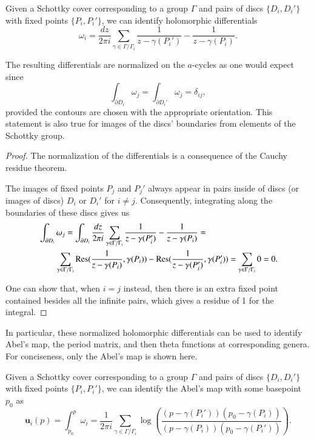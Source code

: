 \begin{definition}
    Given a Schottky cover corresponding to a group $\Gamma$ and pairs of discs $\{D_i,D_i'\}$ with fixed points $\{P_i,P_i'\}$, we can identify holomorphic differentials
    \begin{equation}
        \omega_i = \frac{dz}{2\pi i} \sum_{\gamma \in \Gamma / \Gamma_i} \frac{1}{z - \gamma(P_i')} - \frac{1}{z - \gamma(P_i)}.
    \end{equation}

    The resulting differentials are normalized on the $a$-cycles as one would expect since
    \begin{equation}
        \int_{\partial D_i} \omega_j = \int_{\partial D_i'} \omega_j = \delta_{ij},
    \end{equation}
    provided the contours are chosen with the appropriate orientation. This statement is also true for images of the discs' boundaries from elements of the Schottky group.
\end{definition}
\begin{proof}
    The normalization of the differentials is a consequence of the Cauchy residue theorem.

    The images of fixed points $P_j$ and $P_j'$ always appear in pairs inside of discs (or images of discs) $D_i$ or $D_i'$ for $i \neq j$.
    Consequently, integrating along the boundaries of these discs gives us
    \begin{align}
        & \int_{\partial D_i} \omega_j =
        \int_{\partial D_i} \frac{dz}{2\pi i} \sum_{\gamma \in \Gamma / \Gamma_i} \frac{1}{z - \gamma(P_i')} - \frac{1}{z - \gamma(P_i)} = \\
        & \quad \quad \sum_{\gamma \in \Gamma / \Gamma_i} \operatorname{Res}(\frac{1}{z - \gamma(P_i)},\gamma(P_i)) - \operatorname{Res}(\frac{1}{z - \gamma(P_i')},\gamma(P_i')) =
        \sum_{\gamma \in \Gamma / \Gamma_i} 0 = 0.
    \end{align}

    One can show that, when $i = j$ instead, then there is an extra fixed point contained besides all the infinite pairs, which gives a residue of 1 for the integral.
\end{proof}

In particular, these normalized holomorphic differentials can be used to identify Abel's map, the period matrix, and then theta functions at corresponding genera.
For conciseness, only the Abel's map is shown here.

\begin{definition}
    Given a Schottky cover corresponding to a group $\Gamma$ and pairs of discs $\{D_i,D_i'\}$ with fixed points $\{P_i,P_i'\}$, we can identify the Abel's map with some basepoint $p_0$ as
    \begin{equation}
        \mathbf{u}_i(p) = \int_{p_0}^p \omega_i = \frac{1}{2\pi i } \sum_{\gamma \in \Gamma/\Gamma_i} \log\left(\frac{(p-\gamma(P_i'))(p_0-\gamma(P_i))}{(p-\gamma(P_i))(p_0-\gamma(P_i'))}\right).
    \end{equation}
\end{definition}

